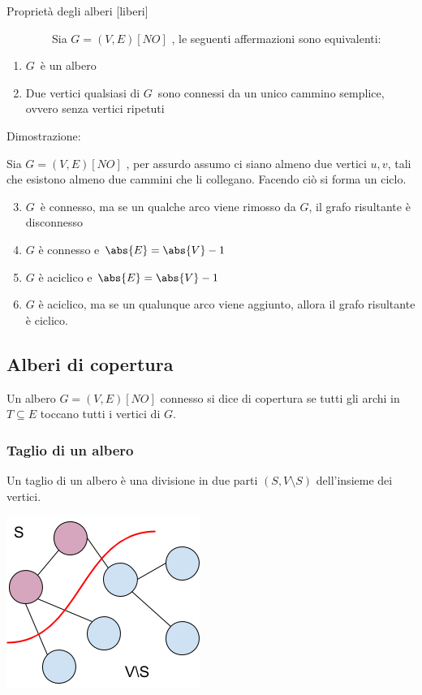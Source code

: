 \documentclass{article}
\providecommand{\tightlist}{%
  \setlength{\itemsep}{0pt}\setlength{\parskip}{0pt}}
\begin{document}
{{{{Proprietà degli alberi {[}liberi{]}}

{~~~~~~~~Sia }$G=(V,E) [NO]$ {, le seguenti affermazioni sono equivalenti:}

\begin{enumerate}
\tightlist
\item
  $G${~è un albero}
\item
  {Due vertici qualsiasi di }$G${~sono
  connessi da un unico cammino semplice, ovvero senza vertici ripetuti}
\end{enumerate}

{Dimostrazione}{:~~~~~~~~}

{Sia }$G=(V,E) [NO]$ {, per assurdo assumo ci siano almeno due vertici $u,v$, tali che esistono almeno due cammini che li collegano. Facendo ciò si forma un ciclo.}

\begin{enumerate}
\setcounter{enumi}{2}
\tightlist
\item
  $G${~è connesso, ma se un qualche
  arco viene rimosso da }$G${, il
  grafo risultante è disconnesso}
\item
  {$G$ è connesso e $\abs{E}=\abs{V}-1$}
\item
  {$G$ è aciclico e $\abs{E}=\abs{V}-1$}
\item
  {$G$ è aciclico, ma se un qualunque arco viene aggiunto, allora il grafo risultante è ciclico.}
\end{enumerate}

{}

\hypertarget{h.9btor4ygb1hb}{\subsection{\texorpdfstring{{Alberi di
copertura}}{Alberi di copertura}}\label{h.9btor4ygb1hb}}

{Un albero $G=(V,E) [NO]$ connesso si dice di copertura se tutti gli archi in $T \subseteq E$ toccano tutti i vertici di $G$.}

\hypertarget{h.rdrr6bsx8ypo}{\subsubsection{\texorpdfstring{{Taglio di
un albero}}{Taglio di un albero}}\label{h.rdrr6bsx8ypo}}

{Un taglio di un albero è una divisione in due parti $(S,V\setminus S)$ dell'insieme dei vertici.}

{}

{\includegraphics{images/image527.png}}

}}}
\end{document}
